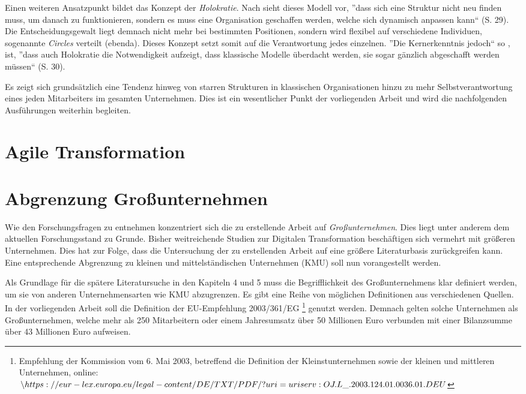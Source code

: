 Einen weiteren Ansatzpunkt bildet das Konzept der \textit{Holokratie}. Nach  sieht dieses Modell vor, ''dass sich eine Struktur nicht neu finden muss, um danach zu funktionieren, sondern es muss eine Organisation geschaffen werden, welche sich dynamisch anpassen kann`` (S. 29). Die Entscheidungsgewalt liegt demnach nicht mehr bei bestimmten Positionen, sondern wird flexibel auf verschiedene Individuen, sogenannte \textit{Circles} verteilt (ebenda). Dieses  Konzept setzt somit auf die Verantwortung jedes einzelnen. ''Die Kernerkenntnis jedoch`` so , ist,  ''dass auch Holokratie die Notwendigkeit aufzeigt, dass klassische Modelle überdacht werden, sie sogar gänzlich abgeschafft werden müssen`` (S. 30). 

Es zeigt sich grundsätzlich eine Tendenz hinweg von starren Strukturen in klassischen Organisationen hinzu zu mehr Selbstverantwortung eines jeden Mitarbeiters im gesamten Unternehmen. Dies ist ein wesentlicher Punkt der vorliegenden Arbeit und wird die nachfolgenden Ausführungen weiterhin begleiten.

\section{Agile Transformation}

\todots
{}

\section{Abgrenzung Großunternehmen}

Wie den Forschungsfragen zu entnehmen konzentriert sich die zu erstellende Arbeit auf \textit{Großunternehmen}. Dies liegt unter anderem dem aktuellen Forschungsstand zu Grunde. Bisher weitreichende Studien zur Digitalen Transformation beschäftigen sich vermehrt mit größeren Unternehmen. Dies hat zur Folge, dass die Untersuchung der zu erstellenden Arbeit auf eine größere Literaturbasis zurückgreifen kann. Eine entsprechende Abgrenzung zu kleinen und mittelständischen Unternehmen (KMU) soll nun vorangestellt werden.

Als Grundlage für die spätere Literatursuche in den Kapiteln 4 und 5 muss die Begrifflichkeit  des Großunternehmens  klar definiert werden, um sie von anderen Unternehmensarten wie KMU abzugrenzen. Es gibt eine Reihe von möglichen Definitionen aus verschiedenen Quellen. In der vorliegenden Arbeit soll die Definition der EU-Empfehlung 2003/361/EG \footnote{Empfehlung der Kommission vom 6. Mai 2003, betreffend die Definition der Kleinstunternehmen sowie der kleinen und mittleren Unternehmen, online: $\url{https://eur-lex.europa.eu/legal-content/DE/TXT/PDF/?uri=uriserv:OJ.L_.2003.124.01.0036.01.DEU}$} genutzt werden. Demnach gelten solche Unternehmen als Großunternehmen, welche mehr als 250 Mitarbeitern oder einem Jahresumsatz über 50 Millionen Euro verbunden mit einer Bilanzsumme über 43 Millionen Euro aufweisen.

